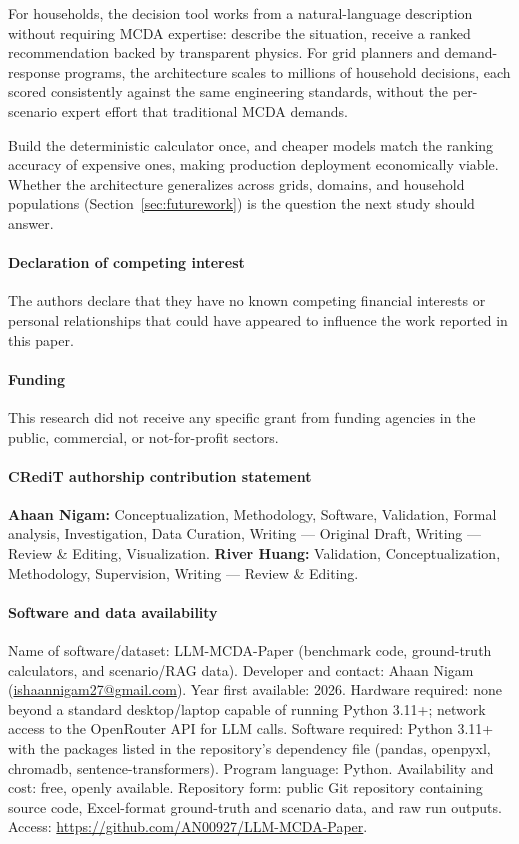\documentclass[a4paper,fleqn]{cas-dc}
\begin{document}
For households, the decision tool works from a natural-language description without requiring MCDA expertise: describe the situation, receive a ranked recommendation backed by transparent physics. For grid planners and demand-response programs, the architecture scales to millions of household decisions, each scored consistently against the same engineering standards, without the per-scenario expert effort that traditional MCDA demands.

Build the deterministic calculator once, and cheaper models match the ranking accuracy of expensive ones, making production deployment economically viable. Whether the architecture generalizes across grids, domains, and household populations (Section~\ref{sec:futurework}) is the question the next study should answer.

\clearpage

\paragraph*{Declaration of competing interest}
The authors declare that they have no known competing financial interests or personal relationships that could have appeared to influence the work reported in this paper.

\paragraph*{Funding}
This research did not receive any specific grant from funding agencies in the public, commercial, or not-for-profit sectors.

\paragraph*{CRediT authorship contribution statement}
\textbf{Ahaan Nigam:} Conceptualization, Methodology, Software, Validation, Formal analysis, Investigation, Data Curation, Writing --- Original Draft, Writing --- Review \& Editing, Visualization. \textbf{River Huang:} Validation, Conceptualization, Methodology, Supervision, Writing --- Review \& Editing.

\paragraph*{Software and data availability}
Name of software/dataset: LLM-MCDA-Paper (benchmark code, ground-truth calculators, and scenario/RAG data). Developer and contact: Ahaan Nigam (\href{mailto:ishaannigam27@gmail.com}{ishaannigam27@gmail.com}). Year first available: 2026. Hardware required: none beyond a standard desktop/laptop capable of running Python 3.11+; network access to the OpenRouter API for LLM calls. Software required: Python 3.11+ with the packages listed in the repository's dependency file (pandas, openpyxl, chromadb, sentence-transformers). Program language: Python. Availability and cost: free, openly available. Repository form: public Git repository containing source code, Excel-format ground-truth and scenario data, and raw run outputs. Access: \url{https://github.com/AN00927/LLM-MCDA-Paper}.
\end{document}
